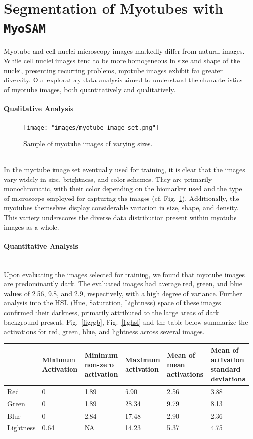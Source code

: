 \section{Segmentation of Myotubes with \texttt{MyoSAM}}\label{secsam}

Myotube and cell nuclei microscopy images markedly differ from natural images. While cell nuclei images tend to be more homogeneous in size and shape of the nuclei, presenting recurring problems, myotube images exhibit far greater diversity. Our exploratory data analysis aimed to understand the characteristics of myotube images, both quantitatively and qualitatively.

\paragraph{Qualitative Analysis}
\begin{figure}
	\centering
	\texttt{[image: "images/myotube\_image\_set.png"]}
	\caption[Sample myotube images]{Sample of myotube images of varying sizes.}
	\label{figsamplemyotubes}
\end{figure}
\ \\
In the myotube image set eventually used for training, it is clear that the images vary widely in size, brightness, and color schemes. They are primarily monochromatic, with their color depending on the biomarker used and the type of microscope employed for capturing the images (cf. Fig.~\ref{figsamplemyotubes}). Additionally, the myotubes themselves display considerable variation in size, shape, and density. This variety underscores the diverse data distribution present within myotube images as a whole.

\paragraph{Quantitative Analysis}
\ \\
Upon evaluating the images selected for training, we found that myotube images are predominantly dark. The evaluated images had average red, green, and blue values of 2.56, 9.8, and 2.9, respectively, with a high degree of variance. Further analysis into the HSL (Hue, Saturation, Lightness) space of these images confirmed their darkness, primarily attributed to the large areas of dark background present. Fig.~\ref{figrgb}, Fig.~\ref{fighsl} and the table below summarize the activations for red, green, blue, and lightness across several images.

\begin{tabular}{|p{2cm}|p{2cm}|p{2cm}|p{2cm}|p{2cm}|p{2cm}|}
	\hline
	& Minimum Activation & Minimum non-zero  activation & Maximum activation & Mean of mean activations & Mean of activation standard deviations \\
	\hline
	Red & 0 & 1.89 & 6.90 & 2.56 & 3.88 \\
	\hline
	Green & 0 & 1.89 & 28.34 & 9.79 & 8.13 \\
	\hline
	Blue & 0 & 2.84 & 17.48 & 2.90 & 2.36 \\
	\hline
	Lightness & 0.64 & NA & 14.23 & 5.37 & 4.75 \\
	\hline
\end{tabular}


